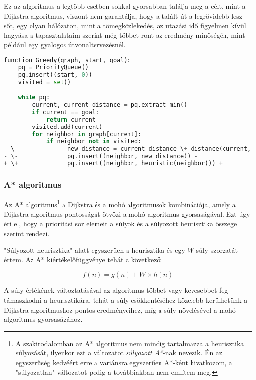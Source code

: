Ez az algoritmus a legtöbb esetben sokkal gyorsabban találja meg a célt, mint a Dijkstra algoritmus, viszont nem garantálja, hogy a talált út a legrövidebb lesz --- sőt, egy olyan hálózaton, mint a tömegközlekedés, az utazási idő figyelmen kívül hagyása a tapasztalataim szerint még többet ront az eredmény minőségén, mint például egy gyalogos útvonaltervezésnél. \\

\begin{minipage}{\textwidth}
\begin{lstlisting}[language={Python}, style=gitdiff]
function Greedy(graph, start, goal):
    pq = PriorityQueue()
    pq.insert((start, 0))
    visited = set()

    while pq:
        current, current_distance = pq.extract_min()
        if current == goal:
            return current
        visited.add(current)
        for neighbor in graph[current]:
            if neighbor not in visited:
- \-              new_distance = current_distance \+ distance(current, neighbor) -
- \-              pq.insert((neighbor, new_distance)) -
+ \+              pq.insert((neighbor, heuristic(neighbor))) +
\end{lstlisting}
\end{minipage}

\subsubsection{A* algoritmus}

Az A* algoritmus\footnote{A szakirodalomban az A* algoritmus nem mindig tartalmazza a heurisztika súlyozását, ilyenkor ezt a változatot \textit{súlyozott A*}-nak nevezik\cite{russell2020artificial}. Én az egyszerűség kedvéért erre a variánsra egyszerűen A*-ként hivatkozom, a "súlyozatlan" változatot pedig a továbbiakban nem említem meg.} a Dijkstra és a mohó algoritmusok kombinációja, amely a Dijkstra algoritmus pontosságát ötvözi a mohó algoritmus gyorsaságával. Ezt úgy éri el, hogy a prioritási sor elemeit a súlyok és a súlyozott heurisztika összege szerint rendezi.

"Súlyozott heurisztika" alatt egyszerűen a heurisztika és egy $W$ súly szorzatát értem. Az A* kiértékelőfüggvénye tehát a következő\cite{russell2020artificial}:

$$f(n) = g(n) + W \times h(n)$$

A súly értékének változtatásával az algoritmus többet vagy kevesebbet fog támaszkodni a heurisztikára, tehát a súly csökkentéséhez közelebb kerülhetünk a Dijkstra algoritmushoz pontos eredményeihez, míg a súly növelésével a mohó algoritmus gyorsaságához.

